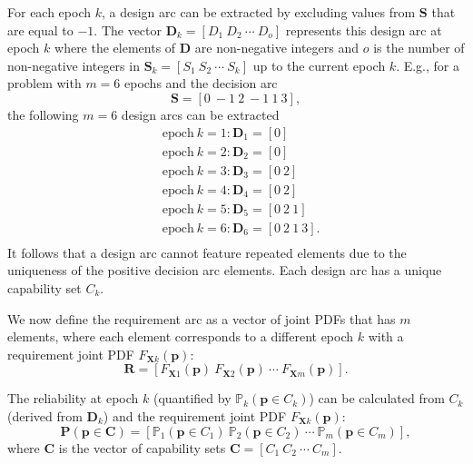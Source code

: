 For each epoch $k$, a design arc can be extracted by excluding values from $\mathbf{S}$ that are equal to $-1$. The vector $\mathbf{D}_k = \left[D_1 ~ D_2 ~ \cdots ~ D_o\right]$ represents this design arc at epoch $k$ where the elements of $\mathbf{D}$ are non-negative integers and $o$ is the number of non-negative integers in $\mathbf{S}_k = \left[S_1 ~ S_2 ~ \cdots ~ S_k\right]$ up to the current epoch $k$. E.g., for a problem with $m=6$ epochs and the decision arc
%
\begin{equation*} \label{eq:decisionarcex}
	\mathbf{S} = \left[0 ~ -1 ~ 2 ~ -1 ~ 1 ~ 3\right],
\end{equation*}
%
the following $m=6$ design arcs can be extracted 
%
\begin{equation*}
	\begin{aligned}
		& \mathrm{epoch~} k=1: \mathbf{D}_1 = \left[0\right]\\
		& \mathrm{epoch~} k=2: \mathbf{D}_2 = \left[0\right]\\
		& \mathrm{epoch~} k=3: \mathbf{D}_3 = \left[0 ~ 2\right]\\
		& \mathrm{epoch~} k=4: \mathbf{D}_4 = \left[0 ~ 2\right]\\
		& \mathrm{epoch~} k=5: \mathbf{D}_5 = \left[0 ~ 2 ~ 1\right]\\
		& \mathrm{epoch~} k=6: \mathbf{D}_6 = \left[0 ~ 2 ~ 1 ~ 3\right].\\
	\end{aligned}
\end{equation*}
%
It follows that a design arc cannot feature repeated elements due to the uniqueness of the positive decision arc elements. Each design arc has a unique capability set $C_k$.

We now define the requirement arc as a vector of joint \acp{PDF} that has $m$ elements, where each element corresponds to a different epoch $k$ with a requirement joint \ac{PDF} $F_{\mathbf{X}k}(\mathbf{p})$:
%
\begin{equation} \label{eq:requirementarc}
	\mathbf{R} = \left[F_{\mathbf{X}1}(\mathbf{p}) ~ F_{\mathbf{X}2}(\mathbf{p}) ~ \cdots ~ F_{\mathbf{X}m}(\mathbf{p})\right].%
\end{equation}

The reliability at epoch $k$ (quantified by $\mathbb{P}_k(\mathbf{p} \in C_k)$) can be calculated from $C_k$ (derived from $\mathbf{D}_k$) and the requirement joint \ac{PDF} $F_{\mathbf{X}k}(\mathbf{p})$:
%
\begin{equation} \label{eq:reliabilityvector}
	\mathbf{P}(\mathbf{p} \in \mathbf{C}) = \left[\mathbb{P}_1(\mathbf{p} \in C_1) ~ \mathbb{P}_2(\mathbf{p} \in C_2) ~ \cdots ~ \mathbb{P}_m(\mathbf{p} \in C_m)\right],%
\end{equation}
%
where $\mathbf{C}$ is the vector of capability sets $\mathbf{C} = \left[C_1 ~ C_2 ~ \cdots ~ C_m\right]$.%

